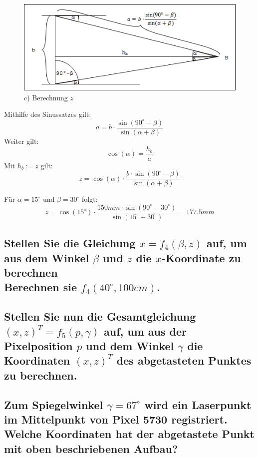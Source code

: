 \documentclass[a4paper,10pt,DIV=14]{scrartcl}
\newcommand{\dg}[1]{#1^\circ}
\begin{document}
\begin{figure}[!htbp]
	\centering
	\includegraphics[width=.95\linewidth]{z.png}
	\caption*{c) Berechnung $z$}
\end{figure}

Mithilfe des Sinussatzes gilt: $$ a = b \cdot \frac{\sin(\dg{90} - \beta)}{\sin(\alpha + \beta)} $$
Weiter gilt: $$ \cos(\alpha) = \frac{h_b}{a} $$
Mit $h_b := z$ gilt:
$$ z = \cos(\alpha) \cdot \frac{b \cdot \sin(\dg{90} - \beta)}{\sin(\alpha + \beta)} $$

Für $\alpha = \dg{15}$ und $\beta = \dg{30}$ folgt:
$$ z = \cos(\dg{15}) \cdot \frac{150mm \cdot \sin(\dg{90} - \dg{30})}{\sin(\dg{15} + \dg{30})} = 177.5mm $$

\subsection{Stellen Sie die Gleichung $x = f_4(\beta, z)$ auf, um aus dem Winkel $\beta$ und $z$ die $x$-Koordinate zu berechnen \\ Berechnen sie $f_4(40^\circ, 100cm)$.}

\subsection{Stellen Sie nun die Gesamtgleichung $(x,z)^T = f_5(p, \gamma)$ auf, um aus der Pixelposition $p$ und dem Winkel $\gamma$ die Koordinaten $(x, z)^T$ des abgetasteten Punktes zu berechnen.}

\subsection{Zum Spiegelwinkel $\gamma = 67^\circ$ wird ein Laserpunkt im Mittelpunkt von Pixel 5730 registriert. Welche Koordinaten hat der abgetastete Punkt mit oben beschriebenen Aufbau?}
\end{document}
